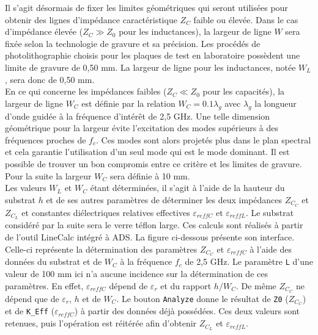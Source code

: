 \documentclass[french]{article}
\begin{document}
Il s'agit désormais de fixer les limites géométriques qui seront utilisées pour obtenir des lignes d'impédance caractéristique $Z_C$ faible ou élevée. Dans le cas d'impédance élevée ($Z_C \gg Z_0$ pour les inductances), la largeur de ligne $W$ sera fixée selon la technologie de gravure et sa précision. Les procédés de photolithographie choisis pour les plaques de test en laboratoire possèdent une limite de gravure de 0,50 mm. La largeur de ligne pour les inductances, notée $W_L$, sera donc de 0,50 mm.\\
En ce qui concerne les impédances faibles ($Z_C \ll Z_0$ pour les capacités), la largeur de ligne $W_C$ est définie par la relation $W_C = 0.1\lambda_g$ avec $\lambda_g$ la longueur d'onde guidée à la fréquence d'intérêt de 2,5 GHz. Une telle dimension géométrique pour la largeur évite l'excitation des modes supérieurs à des fréquences proches de $f_c$. Ces modes sont alors projetés plus dans le plan spectral et cela garantie l'utilisation d'un seul mode qui est le mode dominant. Il est possible de trouver un bon compromis entre ce critère et les limites de gravure. Pour la suite la largeur $W_C$ sera définie à 10 mm.\\

Les valeurs $W_L$ et $W_C$ étant déterminées, il s'agit à l'aide de la hauteur du substrat $h$ et de ses autres paramètres de déterminer les deux impédances $Z_{C_C}$ et $Z_{C_L}$ et constantes diélectriques relatives effectives $\varepsilon_{reffC}$ et $\varepsilon_{reffL}$. Le substrat considéré par la suite sera le verre téflon large. Ces calculs sont réalisés à partir de l'outil LineCalc intégré à ADS. La figure ci-dessous présente son interface. Celle-ci représente la détermination des paramètres $Z_{C_C}$ et $\varepsilon_{reffC}$ à l'aide des données du substrat et de $W_C$ à la fréquence $f_c$ de 2,5 GHz. Le paramètre \texttt{L} d'une valeur de 100 mm ici n'a aucune incidence sur la détermination de ces paramètres. En effet, $\varepsilon_{reffC}$ dépend de $\varepsilon_{r}$ et du rapport $h/W_C$. De même $Z_{C_C}$ ne dépend que de $\varepsilon_{r}$, $h$ et de $W_C$. Le bouton \texttt{Analyze} donne le résultat de \texttt{Z0} ($Z_{C_C}$) et de \texttt{K\_Eff} ($\varepsilon_{reffC}$) à partir des données déjà possédées. Ces deux valeurs sont retenues, puis l'opération est réitérée afin d'obtenir $Z_{C_L}$ et $\varepsilon_{reffL}$.
\end{document}
